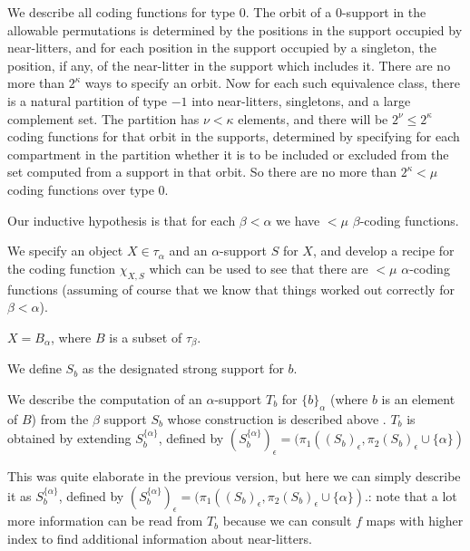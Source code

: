 \documentclass[112pt]{article}
\begin{document}
\begin{description}

\item[Analysis of coding functions for type 0:]  We describe all coding functions for type 0.  The orbit of a 0-support in the allowable permutations is determined by the positions in the support  occupied by near-litters, and for each position in the support occupied by a singleton, the position, if any, of the near-litter in the support  which includes it.  There are no more than $2^\kappa$ ways to specify an orbit.  Now for each such equivalence class, there is a natural partition of type $-1$ into near-litters, singletons, and a large complement set.  The partition has $\nu<\kappa$ elements, and there will be $2^\nu\leq 2^\kappa$ coding functions for that orbit in the supports, determined by specifying for each compartment in the partition whether it is to be included or excluded from the set computed from a support in that orbit.  So there are no more than $2^\kappa<\mu$ coding functions over type 0.

\item[Analysis of the general case:]  

\item
Our inductive hypothesis is that for each $\beta<\alpha$ we have $<\mu$ $\beta$-coding functions.



We specify an object $X\in \tau_\alpha$ and an $\alpha$-support $S$ for $X$, and develop a recipe for the coding function $\chi_{X,S}$ which can be used to see that there are $<\mu$ $\alpha$-coding functions (assuming of course that we know that things worked out correctly for $\beta<\alpha$).

$X = B_\alpha$, where $B$ is a subset of $\tau_\beta$.  

We define $S_b$ as the designated strong support for $b$.

We describe the computation of an $\alpha$-support $T_b$
for $\{b\}_\alpha$ (where $b$ is an element of $B$) from the $\beta$ support $S_b$ whose construction is described above .  $T_b$ is obtained by extending $S_b^{\{\alpha\}}$, defined by $(S_b^{\{\alpha\}})_\epsilon=(\pi_1((S_b)_\epsilon,\pi_2(S_b)_\epsilon \cup \{\alpha\})$


This was quite elaborate in the previous version, but here we can simply describe it as $S_b^{\{\alpha\}}$, defined by $(S_b^{\{\alpha\}})_\epsilon=(\pi_1((S_b)_\epsilon,\pi_2(S_b)_\epsilon \cup \{\alpha\})$.:  note that a lot more information can be read from $T_b$ because
we can consult $f$ maps with higher index to find additional information about near-litters.


\end{description}
\end{document}
